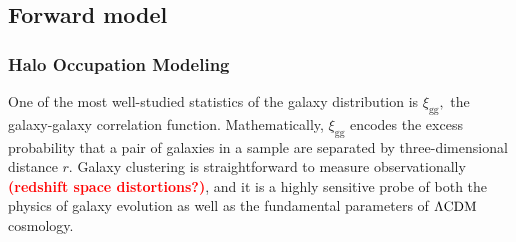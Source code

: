 \documentclass[12pt, preprint]{aastex}
\newcommand{\todo}[1]{{\bf \textcolor{red}{ #1}}}
\begin{document}


\subsection{Forward model}\label{sec:halo}
\subsubsection{Halo Occupation Modeling}

\newcommand{\lcdm}{\Lambda {\rm CDM}}
\newcommand{\dd}{\mathrm{d}}
\newcommand{\mean}[2]{\left\langle#1 \vert {#2}\right\rangle}

\newcommand{\ngal}{N_{\mathrm{g}}}
\newcommand{\nsat}{N_\mathrm{s}}
\newcommand{\ncen}{N_\mathrm{c}}
\newcommand{\pnm}[2]{P(#1|#2)}

\newcommand{\mhalo}{M_{\rm h}}
\newcommand{\mvir}{M_\mathrm{vir}} 

\newcommand{\dndmvir}{\frac{\dd n}{\dd\mvir}}
\newcommand{\dndmhalo}{\frac{\dd n}{\dd\mhalo}}
\newcommand{\dndmvirprime}{\frac{\dd n}{\dd\mvir'}}

\newcommand{\xigg}{\xi_{\mathrm{gg}}}
\newcommand{\xihh}{\xi_{\mathrm{hh}}}
\newcommand{\xiggr}{\xi_{\mathrm{gg}}(r)}
\newcommand{\xiggroneh}{\xi^{1h}_{\mathrm{gg}}(r)}
\newcommand{\xiggrtwoh}{\xi^{2h}_{\mathrm{gg}}(r)}
\newcommand{\ngalaxy}{\bar{n}_{\mathrm{g}}}
\newcommand{\gmf}{\mathcal{\zeta}_{\rm g}}

One of the most well-studied statistics of the galaxy distribution 
is $\xigg,$ the galaxy-galaxy correlation function. Mathematically, $\xigg$ encodes the
excess probability that a pair of galaxies in a sample are 
separated by three-dimensional distance $r.$ 
Galaxy clustering is straightforward to measure observationally \todo{(redshift space distortions?)}, 
and it is a highly sensitive probe of both the physics of galaxy evolution 
as well as the fundamental parameters of $\lcdm$ cosmology. 
\end{document}
